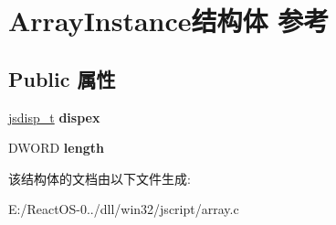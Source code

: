\hypertarget{struct_array_instance}{}\section{Array\+Instance结构体 参考}
\label{struct_array_instance}
\subsection*{Public 属性}
\begin{DoxyCompactItemize}
\item 
\mbox{\label{struct_array_instance_a533e0f1b20eddb2c93f36f815a443dd7}} 
\hyperlink{structjsdisp__t}{jsdisp\+\_\+t} {\bfseries dispex}
\item 
\mbox{\label{struct_array_instance_add6e39c276a7571ef7d5d08ca1bec485}} 
D\+W\+O\+RD {\bfseries length}
\end{DoxyCompactItemize}


该结构体的文档由以下文件生成\+:\begin{DoxyCompactItemize}
\item 
E\+:/\+React\+O\+S-\/0../dll/win32/jscript/array.\+c\end{DoxyCompactItemize}
